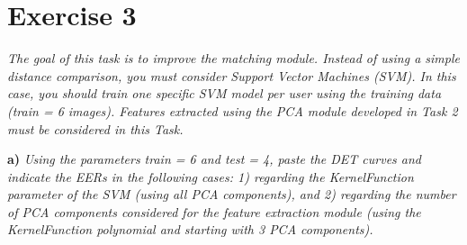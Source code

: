 \documentclass[11pt]{article}
\begin{document}
\section*{Exercise 3}

\textit{The goal of this task is to improve the matching module. Instead of using a simple distance comparison, you must consider Support Vector Machines (SVM). In this case, you should train one specific SVM model per user using the training data (train = 6 images). Features extracted using the PCA module developed in Task 2 must be considered in this Task.}


\textbf{a)} \emph{Using the parameters train = 6 and test = 4, paste the DET curves and indicate the EERs in the following cases: 1) regarding the KernelFunction parameter of the SVM (using all PCA components), and 2) regarding the number of PCA components considered for the feature extraction module (using the KernelFunction polynomial and starting with 3 PCA components).}
\end{document}
